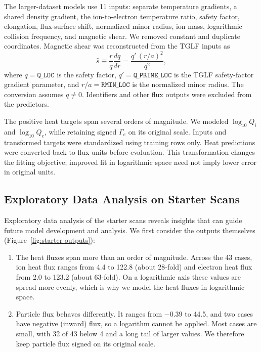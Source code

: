 \documentclass[12pt,letterpaper]{article}
\begin{document}
The larger-dataset models use 11 inputs: separate temperature gradients, a
shared density gradient, the ion-to-electron temperature ratio, safety factor,
elongation, flux-surface shift, normalized minor radius, ion mass, logarithmic
collision frequency, and magnetic shear. We removed constant and duplicate
coordinates. Magnetic shear was reconstructed from the TGLF inputs as
\[
  \hat{s} \equiv \frac{r}{q}\frac{dq}{dr}
  = \frac{q'\,(r/a)^{2}}{q^{2}},
\]
where $q=\mathtt{Q\_LOC}$ is the safety factor, $q'=\mathtt{Q\_PRIME\_LOC}$ is
the TGLF safety-factor gradient parameter, and $r/a=\mathtt{RMIN\_LOC}$ is the
normalized minor radius. The conversion assumes $q\neq 0$.
Identifiers and other flux outputs were excluded from the predictors.

The positive heat targets span several orders of magnitude. We modeled
$\log_{10}Q_i$ and $\log_{10}Q_e$, while retaining signed $\Gamma_e$ on its
original scale. Inputs and transformed targets were standardized using
training rows only. Heat predictions were converted back to flux units before
evaluation. This transformation changes the fitting objective; improved fit
in logarithmic space need not imply lower error in original units.

\subsection{Exploratory Data Analysis on Starter Scans}

Exploratory data analysis of the starter scans reveals insights that can guide
future model development and analysis. We first consider the outputs
themselves (Figure~\ref{fig:starter-outputs}):
\begin{enumerate}
  \item The heat fluxes span more than an order of magnitude. Across the 43
        cases, ion heat flux ranges from 4.4 to 122.8 (about 28-fold) and
        electron heat flux from 2.0 to 123.2 (about 63-fold). On a logarithmic
        axis these values are spread more evenly, which is why we model the
        heat fluxes in logarithmic space.
  \item Particle flux behaves differently. It ranges from $-0.39$ to 44.5, and
        two cases have negative (inward) flux, so a logarithm cannot be
        applied. Most cases are small, with 32 of 43 below 4 and a long tail
        of larger values. We therefore keep particle flux signed on its
        original scale.
\end{enumerate}
\end{document}
